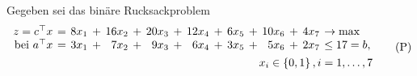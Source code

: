 \begin{beispiel}
	Gegeben sei das binäre Rucksackproblem 
	\begin{equation*}
	\begin{split}
	\setlength{\arraycolsep}{2pt}
	\begin{array}{rcrcrcrcrcrcrcrl}
	z = \trans{c} x &= &8x_1 &+ &16x_2 &+ &20x_3 &+ &12x_4 &+ &6x_5 &+ &10x_6 &+ &4x_7 &\to \max \\
	\bei \trans{a} x &= &3x_1 &+ &7x_2 &+ &9x_3 &+ &6x_4 &+ &3x_5 &+ &5x_6 &+ &2x_7 &\le 17 = b, 
	\end{array}
	\\
	x_i \in \menge{0,1}, i = 1, \dots, 7
	\end{split}
	\tag{P} \label{eq: rucksack-bsp-p}
	\end{equation*}
	

\end{beispiel}
